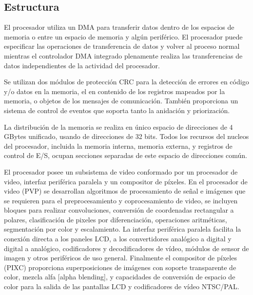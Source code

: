\subsection{Estructura}

El procesador utiliza un DMA para transferir datos dentro de los espacios de memoria o entre un espacio de memoria y
algún periférico. El procesador puede especificar las operaciones de transferencia de datos y volver al proceso normal
mientras el controlador DMA integrado plenamente realiza las transferencias de datos independientes de la actividad del
procesador. 

Se utilizan dos módulos de protección CRC \cite{Waqar2010} para la detección de errores en código y/o datos en la
memoria, el en contenido de los registros mapeados por la memoria, o objetos de los mensajes de comunicación. También
proporciona un sistema de control de eventos que soporta tanto la anidación y priorización. 


La distribución de la memoria se realiza en único espacio de direcciones de 4 GBytes  unificado, usando de direcciones de
32 bits. Todos los recursos del nucleos del procesador, incluida la memoria interna, memoria externa, y registros de
control de E/S, ocupan secciones separadas de este espacio de direcciones común. 

El procesador posee un subsistema de video conformado por un procesador de video, interfaz periférica paralela y un
compositor de píxeles. En el procesador de video (PVP) se desarrollan algoritmos de procesamiento de señal e imágenes que
se requieren para el preprocesamiento y coprocesamiento de video, se incluyen bloques para realizar convoluciones, 
conversión de coordenadas rectangular a polares, clasificación de pixeles por diferenciación, operaciones aritméticas,
segmentación por color\cite{sevilla} y escalamiento. La interfaz periférica paralela facilita la conexión directa a los
paneles LCD, a los convertidores analógico a digital y digital a analógico, codificadores y decodificadores de vídeo,
módulos de sensor de imagen y otros periféricos de uso general. Finalmente el compositor de píxeles (PIXC) proporciona
superposiciones de imágenes con soporte transparente de color, mezcla alfa [alpha blending], y capacidades de conversión
de espacio de color para la salida de las pantallas LCD y codificadores 
de vídeo NTSC/PAL.



